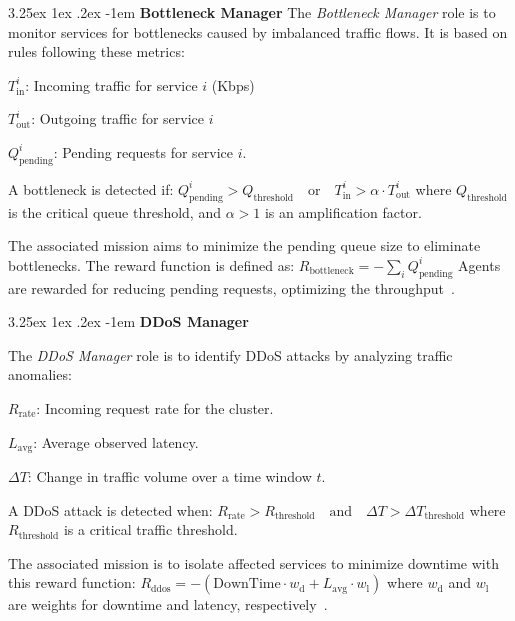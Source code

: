\documentclass[conference]{IEEEtran}
\makeatletter
\renewcommand\paragraph{\@startsection{paragraph}{5}{\z@}%
  {3.25ex \@plus1ex \@minus.2ex}%
  {-1em}%
  {\normalfont\normalsize\bfseries}}
\makeatother
\begin{document}
\noindent \paragraph{\textbf{Bottleneck Manager}} 
%
The \textit{Bottleneck Manager} role is to monitor services for bottlenecks caused by imbalanced traffic flows. It is based on rules following these metrics:
\begin{enumerate*}[label={}, itemjoin={;\quad }]
    \item \( T_{\text{in}}^i \): Incoming traffic for service \( i \) (Kbps)
    \item \( T_{\text{out}}^i \): Outgoing traffic for service \( i \)
    \item \( Q_{\text{pending}}^i \): Pending requests for service \( i \).
\end{enumerate*}
A bottleneck is detected if: $Q_{\text{pending}}^i > Q_{\text{threshold}} \quad \text{or} \quad T_{\text{in}}^i > \alpha \cdot T_{\text{out}}^i$
where \( Q_{\text{threshold}} \) is the critical queue threshold, and \( \alpha > 1 \) is an amplification factor.

The associated mission aims to minimize the pending queue size to eliminate bottlenecks. The reward function is defined as: $R_{\text{bottleneck}} = - \sum_{i} Q_{\text{pending}}^i$
Agents are rewarded for reducing pending requests, optimizing the throughput~\cite{burns2016borg}.

\noindent \paragraph{\textbf{DDoS Manager}}

The \textit{DDoS Manager} role is to identify DDoS attacks by analyzing traffic anomalies:
\begin{enumerate*}[label={}, itemjoin={;\quad }]
    \item \( R_{\text{rate}} \): Incoming request rate for the cluster.
    \item \( L_{\text{avg}} \): Average observed latency.
    \item \( \Delta T \): Change in traffic volume over a time window \( t \).
\end{enumerate*}
A DDoS attack is detected when:
$R_{\text{rate}} > R_{\text{threshold}} \quad \text{and} \quad \Delta T > \Delta T_{\text{threshold}}$
where \( R_{\text{threshold}} \) is a critical traffic threshold.

The associated mission is to isolate affected services to minimize downtime with this reward function:
$R_{\text{ddos}} = - \left( \text{DownTime} \cdot w_{\text{d}} + L_{\text{avg}} \cdot w_{\text{l}} \right)$
where \( w_{\text{d}} \) and \( w_{\text{l}} \) are weights for downtime and latency, respectively~\cite{Liu2018}.
\end{document}
